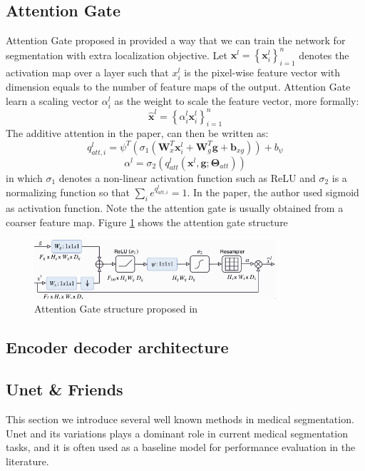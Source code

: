 
\subsection{Attention Gate}
Attention Gate proposed in \cite{} provided a way that we can train the network for segmentation with extra localization objective.
Let $\mathbf{x}^{l}=\left\{\mathbf{x}_{i}^{l}\right\}_{i=1}^{n}$ denotes the activation map over a layer such that $x_{i}^{l}$ is the pixel-wise feature vector with dimension equals to the number of feature maps of the output. Attention Gate learn a scaling vector $\alpha_{i}^{l}$ as the weight to scale the feature vector, more formally:
$$\hat{\mathbf{x}}^{l}=\left\{\alpha_{i}^{l} \mathbf{x}_{i}^{l}\right\}_{i=1}^{n}$$
The additive attention in the paper, can then be written as:
$$q_{a t t, i}^{l}=\psi^{T}\left(\sigma_{1}\left(\boldsymbol{W}_{x}^{T} \boldsymbol{x}_{i}^{l}+\boldsymbol{W}_{g}^{T} \boldsymbol{g}+\boldsymbol{b}_{x g}\right)\right)+b_{\psi}$$
$$\alpha^{l}=\sigma_{2}\left(q_{a t t}^{l}\left(\boldsymbol{x}^{l}, \boldsymbol{g} ; \boldsymbol{\Theta}_{a t t}\right)\right)$$
in which $\sigma_{1}$ denotes a non-linear activation function such as ReLU and $\sigma_{2}$ is a normalizing function so that $\sum_{i} e^{q_{a t t, i}^{l}} = 1$. In the paper, the author used sigmoid as activation function. Note the the attention gate is usually obtained from a coarser feature map. Figure \ref{fig:att_gate} shows the attention gate structure

\begin{figure}
\centering
\includegraphics[width = 0.8\textwidth]{img/background_img/attention_gate}
\caption{Attention Gate structure proposed in \cite{}}
\label{fig:att_gate}
\end{figure}


\subsection{Encoder decoder architecture}



\subsection{Unet \& Friends}
This section we introduce several well known methods in medical segmentation. Unet \cite{ronneberger_u-net_2015} and its variations plays a dominant role in current medical segmentation tasks, and it is often used as a baseline model for performance evaluation in the literature.\\

